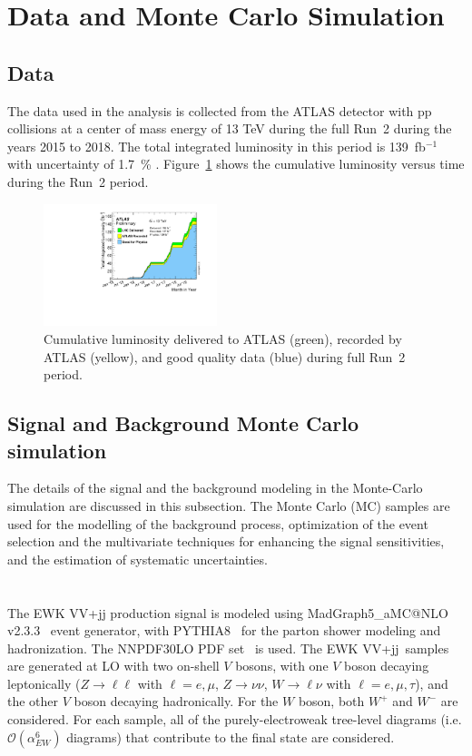 \section{Data and Monte Carlo Simulation}
\subsection{Data}
The data used in the analysis is collected from the ATLAS detector with pp collisions at a center of mass energy of 13 TeV during the full Run~2 during the years 2015 to 2018. The total integrated luminosity in this period is 139~fb$^{-1}$ with uncertainty of 1.7~\% \cite{DAPR-2010-01}. Figure~\ref{fig:luminosity} shows the cumulative luminosity versus time during the Run~2 period.

\begin{figure}[H]
\begin{center}
 \includegraphics[width=0.45\textwidth,keepaspectratio]{figures/intlumivstimeRun2DQall.pdf}
\caption[f]{
Cumulative luminosity delivered to ATLAS (green), recorded by ATLAS (yellow), and good quality data (blue) during full Run~2 period.
}
\label{fig:luminosity}
\end{center}
\end{figure}

\subsection{Signal and Background Monte Carlo simulation}
The details of the signal and the background modeling in the Monte-Carlo simulation are discussed in this subsection.
The Monte Carlo (MC) samples are used for the modelling of the background process, optimization of the event selection and the multivariate techniques for enhancing the signal sensitivities, and the estimation of systematic uncertainties.
\\ \\
\noindent\textbf{} \\ 
The EWK VV+jj production signal is modeled using MadGraph5\_aMC@NLO v2.3.3~\cite{Alwall:2014hca} event generator, with PYTHIA8~\cite{Sjostrand:2007gs} for the parton shower modeling and hadronization. The \textsc{NNPDF30LO} PDF set~\cite{Ball:2012cx} is used. 
The EWK VV+jj\ samples are generated at LO with two on-shell $V$ bosons, with one $V$ boson decaying leptonically
($Z\to \ell\ell$ with $\ell = e, \mu$, $Z\to \nu\nu$, $W\to \ell \nu$ with $\ell= e, \mu, \tau$),
and the other $V$ boson decaying hadronically. For the $W$ boson, both $W^{+}$ and $W^{-}$ are considered.
For each sample, all of the purely-electroweak tree-level diagrams (i.e. $\mathcal{O}(\alpha_{EW}^6)$ diagrams) that contribute to the final state are considered.

